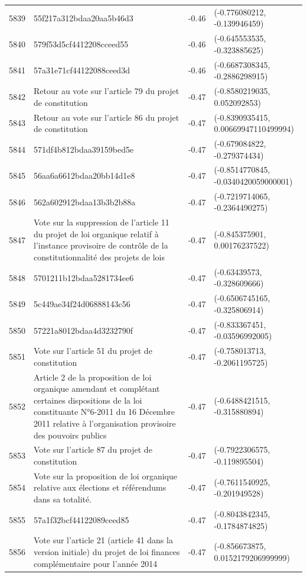 \begin{table}[ht]
\begin{tabular}{rlrl}
  5839 & 55f217a312bdaa20aa5b46d3 & -0.46 & (-0.776080212, -0.139946459) \\ 
  5840 & 579f53d5cf4412208cceed55 & -0.46 & (-0.645553535, -0.323885625) \\ 
  5841 & 57a31e71cf44122088ceed3d & -0.46 & (-0.6687308345, -0.2886298915) \\ 
  5842 & Retour au vote sur l'article 79 du projet de constitution & -0.47 & (-0.8580219035, 0.052092853) \\ 
  5843 & Retour au vote sur l'article 86 du projet de constitution & -0.47 & (-0.8390935415, 0.00669947110499994) \\ 
  5844 & 571df4b812bdaa39159bed5e & -0.47 & (-0.679084822, -0.279374434) \\ 
  5845 & 56aa6a6612bdaa20bb14d1e8 & -0.47 & (-0.8514770845, -0.0340420059000001) \\ 
  5846 & 562a602912bdaa13b3b2b88a & -0.47 & (-0.7219714065, -0.2364490275) \\ 
  5847 & Vote sur la suppression de l'article 11 du projet de loi organique relatif à l'instance provisoire de contrôle de la constitutionnalité des projets de lois & -0.47 & (-0.845375901, 0.00176237522) \\ 
  5848 & 5701211b12bdaa5281734ee6 & -0.47 & (-0.63439573, -0.328609666) \\ 
  5849 & 5c449ae34f24d06888143c56 & -0.47 & (-0.6506745165, -0.325806914) \\ 
  5850 & 57221a8012bdaa4d3232790f & -0.47 & (-0.833367451, -0.03596992005) \\ 
  5851 & Vote sur l'article 51 du projet de constitution & -0.47 & (-0.758013713, -0.2061195725) \\ 
  5852 & Article 2 de la proposition de loi organique amendant et complétant certaines dispositions de la loi constituante N°6-2011 du 16 Décembre 2011 relative à l'organisation provisoire des pouvoirs publics & -0.47 & (-0.6488421515, -0.315880894) \\ 
  5853 & Vote sur l'article 87 du projet de constitution & -0.47 & (-0.7922306575, -0.119895504) \\ 
  5854 & Vote sur la proposition de loi organique relative aux élections et référendums dans sa totalité. & -0.47 & (-0.7611540925, -0.201949528) \\ 
  5855 & 57a1f32bcf44122089ceed85 & -0.47 & (-0.8043842345, -0.1784874825) \\ 
  5856 & Vote sur l'article 21 (article 41 dans la version initiale) du projet de loi finances complémentaire pour l'année 2014 & -0.47 & (-0.856673875, 0.0152179206999999) \\ 

\end{tabular}
\end{table}
